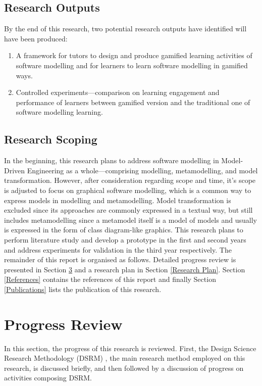 \documentclass[12pt, a4paper]{report} \usepackage[titletoc]{appendix}
\begin{document}
\section{Research Outputs}
By the end of this research, two potential research outputs have identified will have been produced:
\begin{enumerate}
\item A framework for tutors to design and produce gamified learning activities of software modelling and for learners to learn software modelling in gamified ways. 
\item Controlled experiments---comparison on learning engagement and performance of learners between gamified version and the traditional one of software modelling learning.
\end{enumerate}

\section{Research Scoping}
In the beginning, this research plans to address software modelling in Model-Driven Engineering as a whole---comprising modelling, metamodelling, and model transformation. However, after consideration regarding scope and time, it's scope is adjusted to focus on graphical software modelling, which is a common way to express models in modelling and metamodelling. Model transformation is excluded since its approaches are commonly expressed in a textual way, but still includes metamodelling since a metamodel itself is a model of models and usually is expressed in the form of class diagram-like graphics. This research plans to perform literature study and develop a prototype in the first and second years and address experiments for validation in the third year respectively.\newline\newline
The remainder of this report is organised as follows. Detailed
progress review is presented in Section \ref{Progres Review} and a research plan in Section \ref{Research Plan}. Section \ref{References} contains the references of this report and finally Section \ref{Publications} lists the publication of this research.

\chapter{Progress Review}
\label{Progres Review}
In this section, the progress of this research is reviewed. First, the Design Science Research Methodology (DSRM) \cite{peffers2007design}, the main research method employed on this research, is discussed briefly, and then followed by a discussion of progress on activities composing DSRM.
\end{document}
